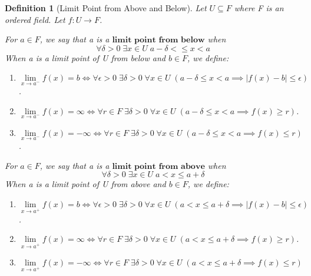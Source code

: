 \documentclass[11pt, oneside]{book}
\theoremstyle{break}
\newtheorem{defn}{Definition}[section]
\begin{document}
\begin{defn}[Limit Point from Above and Below]
	Let $U \subseteq F$ where F is an ordered field. Let $f: U \to F$.

	For $a \in F$, we say that a is a $\textbf{limit point from below}$ when
	\[
		\forall \delta > 0 \; \exists x \in U \; a - \delta < \leq x < a
	\]
	When a is a limit point of U from below and $b \in F$, we define:
	\begin{enumerate}
		\item $\lim\limits_{x \to a^-} f(x) = b \iff \forall \epsilon > 0 \; \exists \delta > 0 \; \forall x \in U \; (a - \delta \leq x < a \implies |f(x) - b| \leq \epsilon)$.
		\item $\lim\limits_{x \to a^-} f(x) = \infty \iff \forall r \in F \; \exists \delta > 0 \; \forall x \in U \; (a - \delta \leq x < a \implies f(x) \geq r)$.
		\item $\lim\limits_{x \to a^-} f(x) = -\infty \iff \forall r \in F \; \exists \delta > 0 \; \forall x \in U \; (a - \delta \leq x < a \implies f(x) \leq r)$.
	\end{enumerate}

	For $a \in F$, we say that a is a $\textbf{limit point from above}$ when
	\[
		\forall \delta > 0 \; \exists x \in U \; a < x \leq a + \delta
	\]
	When a is a limit point of U from above and $b \in F$, we define:
	\begin{enumerate}
		\item $\lim\limits_{x \to a^+} f(x) = b \iff \forall \epsilon > 0 \; \exists \delta > 0 \; \forall x \in U \; (a < x \leq a + \delta \implies |f(x) - b| \leq \epsilon)$.
		\item $\lim\limits_{x \to a^+} f(x) = \infty \iff \forall r \in F \; \exists \delta > 0 \; \forall x \in U \; (a < x \leq a + \delta \implies f(x) \geq r)$.
		\item $\lim\limits_{x \to a^+} f(x) = -\infty \iff \forall r \in F \; \exists \delta > 0 \; \forall x \in U \; (a < x \leq a + \delta \implies f(x) \leq r)$			
	\end{enumerate}
\end{defn}
\end{document}
